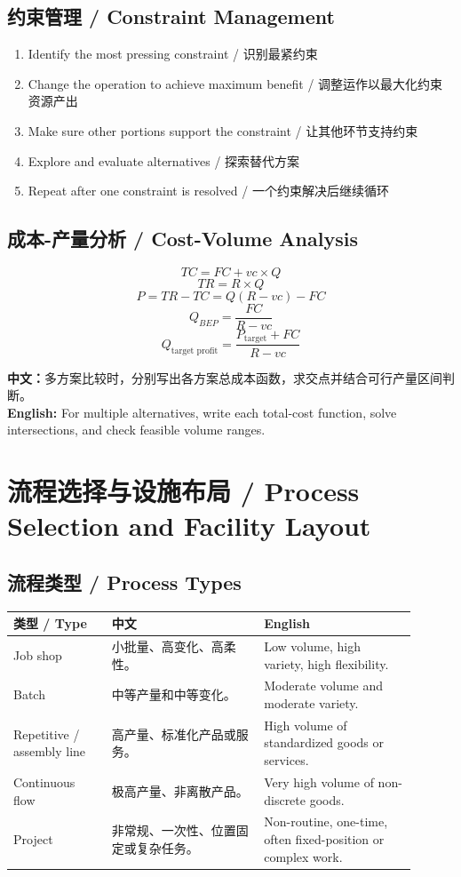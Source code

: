 \documentclass[11pt,a4paper]{ctexart}
\newcommand{\cn}[1]{\textbf{中文：}#1}
\newcommand{\en}[1]{\textbf{English:} #1}
\begin{document}
\subsection{约束管理 / Constraint Management}
\begin{enumerate}
  \item Identify the most pressing constraint / 识别最紧约束
  \item Change the operation to achieve maximum benefit / 调整运作以最大化约束资源产出
  \item Make sure other portions support the constraint / 让其他环节支持约束
  \item Explore and evaluate alternatives / 探索替代方案
  \item Repeat after one constraint is resolved / 一个约束解决后继续循环
\end{enumerate}

\subsection{成本-产量分析 / Cost-Volume Analysis}
\[
TC=FC+vc \times Q
\]
\[
TR=R \times Q
\]
\[
P=TR-TC=Q(R-vc)-FC
\]
\[
Q_{BEP}=\frac{FC}{R-vc}
\]
\[
Q_{\text{target profit}}=\frac{P_{\text{target}}+FC}{R-vc}
\]

\cn{多方案比较时，分别写出各方案总成本函数，求交点并结合可行产量区间判断。}\\
\en{For multiple alternatives, write each total-cost function, solve intersections, and check feasible volume ranges.}

\section{流程选择与设施布局 / Process Selection and Facility Layout}

\subsection{流程类型 / Process Types}
\begin{longtable}{L{0.22\linewidth}L{0.34\linewidth}L{0.34\linewidth}}
\toprule
\textbf{类型 / Type} & \textbf{中文} & \textbf{English} \\
\midrule
Job shop & 小批量、高变化、高柔性。 & Low volume, high variety, high flexibility. \\
Batch & 中等产量和中等变化。 & Moderate volume and moderate variety. \\
Repetitive / assembly line & 高产量、标准化产品或服务。 & High volume of standardized goods or services. \\
Continuous flow & 极高产量、非离散产品。 & Very high volume of non-discrete goods. \\
Project & 非常规、一次性、位置固定或复杂任务。 & Non-routine, one-time, often fixed-position or complex work. \\
\bottomrule
\end{longtable}
\end{document}
